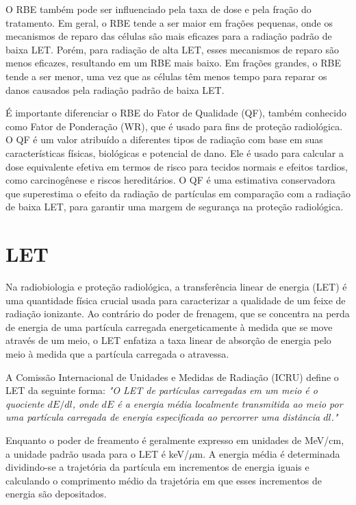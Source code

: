 \documentclass[11pt,a4paper]{article}
\begin{document}
	O RBE também pode ser influenciado pela taxa de dose e pela fração do tratamento. Em geral, o RBE tende a ser maior em frações pequenas, onde os mecanismos de reparo das células são mais eficazes para a radiação padrão de baixa LET. Porém, para radiação de alta LET, esses mecanismos de reparo são menos eficazes, resultando em um RBE mais baixo. Em frações grandes, o RBE tende a ser menor, uma vez que as células têm menos tempo para reparar os danos causados pela radiação padrão de baixa LET.

	É importante diferenciar o RBE do Fator de Qualidade (QF), também conhecido como Fator de Ponderação (WR), que é usado para fins de proteção radiológica. O QF é um valor atribuído a diferentes tipos de radiação com base em suas características físicas, biológicas e potencial de dano. Ele é usado para calcular a dose equivalente efetiva em termos de risco para tecidos normais e efeitos tardios, como carcinogênese e riscos hereditários. O QF é uma estimativa conservadora que superestima o efeito da radiação de partículas em comparação com a radiação de baixa LET, para garantir uma margem de segurança na proteção radiológica.

\section{LET}

	Na radiobiologia e proteção radiológica, a transferência linear de energia (LET) é uma quantidade física crucial usada para caracterizar a qualidade de um feixe de radiação ionizante. Ao contrário do poder de frenagem, que se concentra na perda de energia de uma partícula carregada energeticamente à medida que se move através de um meio, o LET enfatiza a taxa linear de absorção de energia pelo meio à medida que a partícula carregada o atravessa.

	A Comissão Internacional de Unidades e Medidas de Radiação (ICRU) define o LET da seguinte forma:	\textit{"O LET de partículas carregadas em um meio é o quociente $dE/dl$, onde $dE$ é a energia média localmente transmitida ao meio por uma partícula carregada de energia especificada ao percorrer uma distância $dl$."}

	Enquanto o poder de freamento é geralmente expresso em unidades de MeV/cm, a unidade padrão usada para o LET é keV/$\mu$m. A energia média é determinada dividindo-se a trajetória da partícula em incrementos de energia iguais e calculando o comprimento médio da trajetória em que esses incrementos de energia são depositados.
\end{document}
